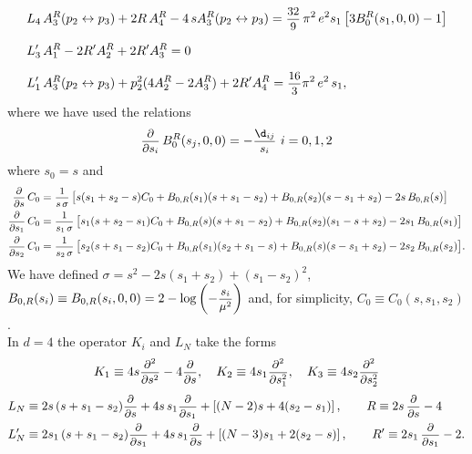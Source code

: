 \documentclass[a4paper,11pt,openright,twoside]{book}
\let\s=\sigma  \let\t=\tau     \let\u=\upsilon \let\f=\phi
\newcommand{\sdfrac}[2]{\mbox{\small$\displaystyle\frac{#1}{#2}$}}
\numberwithin{equation}{section}
\begin{document}
{{\begin{equation}
\begin{split}
		&L_4\,A^R_3(p_2\leftrightarrow p_3)+2R\,A^R_4-4\,sA^R_3(p_2\leftrightarrow p_3)=\sdfrac{32}{9}\,\pi^2\,e^2s_1\left[3B_0^R(s_1,0,0)-1\right]\\[1.5ex]
		&L'_3\,A_1^R-2R'A_2^R+2R'A_3^R=0\\[1.5ex]
		&L'_1\,A_3^R(p_2\leftrightarrow p_3)+p_2^2(4A^R_2-2A^R_3)+2R'A^R_4=\sdfrac{16}{3}\pi^2\,e^2\,s_1,\\
	\end{split}
\end{equation}
where we have used the relations 
\begin{equation}
	\sdfrac{\partial}{\partial s_i}\,B_0^R(s_j,0,0)=-\sdfrac{\d_{ij}}{s_i}\  i=0,1,2
\end{equation}
where $s_0=s$ and 
\begin{align}
	\sdfrac{\partial}{\partial s}\,C_0&= \sdfrac{1}{s\,\s}\,\big[s(s_1+s_2-s)C_0+B_{0,R}(s_1)(s+s_1-s_2)+B_{0,R}(s_2)(s-s_1+s_2)-2s\,B_{0,R}(s)\big]\\
	\sdfrac{\partial}{\partial s_1}\,C_0&= \sdfrac{1}{s_1\,\s}\,\big[s_1(s+s_2-s_1)C_0+B_{0,R}(s)(s+s_1-s_2)+B_{0,R}(s_2)(s_1-s+s_2)-2s_1\,B_{0,R}(s_1)\big]\\
	\sdfrac{\partial}{\partial s_2}\,C_0&= \sdfrac{1}{s_2\,\s}\,\big[s_2(s+s_1-s_2)C_0+B_{0,R}(s_1)(s_2+s_1-s)+B_{0,R}(s)(s-s_1+s_2)-2s_2\,B_{0,R}(s_2)\big].
\end{align}
We have defined $\s=s^2-2s(s_1+s_2)+(s_1-s_2)^2$,  $B_{0,R}(s_i)\equiv B_{0,R}(s_i,0,0)=2-\log\left(-\sdfrac{s_i}{\mu^2}\right)$ and, for simplicity, $C_0\equiv C_0(s,s_1,s_2)$. \\
In $d=4$ the operator $K_i$ and $L_N$ take the forms
\begin{equation}
	K_1\equiv 4s\sdfrac{\partial^2}{\partial s^2}-4\sdfrac{\partial}{\partial s},\quad K_2\equiv 4s_1\sdfrac{\partial^2}{\partial s_1^2},\quad K_3\equiv 4s_2\sdfrac{\partial^2}{\partial s_2^2}
\end{equation}
\begin{align}
	L_N&\equiv 2s\,(s+s_1-s_2)\sdfrac{\partial}{\partial s}+4s\,s_1\sdfrac{\partial}{\partial s_1}+\left[(N-2)s+4(s_2-s_1)\right],\qquad R\equiv2s\,\sdfrac{\partial}{\partial s}-4\\
	L'_N&\equiv 2s_1\,(s+s_1-s_2)\sdfrac{\partial}{\partial s_1}+4s\,s_1\sdfrac{\partial}{\partial s}+\left[(N-3)s_1+2(s_2-s)\right],\qquad R'\equiv2s_1\,\sdfrac{\partial}{\partial s_1}-2.
\end{align}
}}
\end{document}
